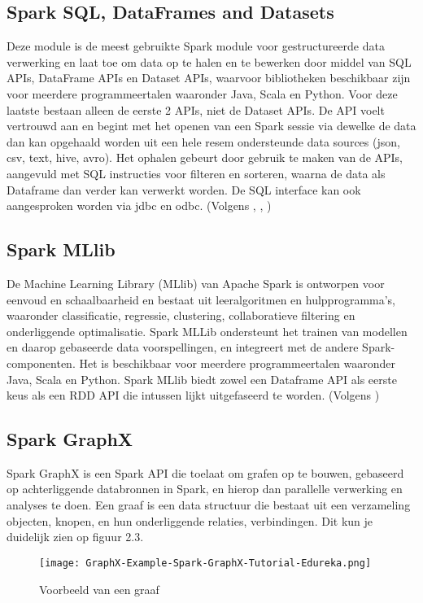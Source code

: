 \subsection{Spark SQL, DataFrames and Datasets}
Deze module is de meest gebruikte Spark module voor gestructureerde data verwerking en laat toe om data op te halen en te bewerken door middel van SQL APIs, DataFrame APIs en Dataset APIs, waarvoor bibliotheken beschikbaar zijn voor meerdere programmeertalen waaronder Java, Scala en Python. Voor deze laatste bestaan alleen de eerste 2 APIs, niet de Dataset APIs.
De API voelt vertrouwd aan en begint met het openen van een Spark sessie via dewelke de data dan kan opgehaald worden uit een hele resem ondersteunde data sources (json, csv, text, hive, avro). Het ophalen gebeurt door gebruik te maken van de APIs, aangevuld met SQL instructies voor filteren en sorteren, waarna de data als Dataframe dan verder kan verwerkt worden.
De SQL interface kan ook aangesproken worden via jdbc en odbc.
(Volgens \textcite{Spark2023}, \textcite{Naveen2023}, \textcite{Spark2023a})

\subsection{Spark MLlib}
De Machine Learning Library (MLlib) van Apache Spark is ontworpen voor eenvoud en schaalbaarheid  en bestaat uit leeralgoritmen en hulpprogramma's, waaronder classificatie, regressie, clustering, collaboratieve filtering en onderliggende optimalisatie. Spark MLLib ondersteunt het trainen van modellen en daarop gebaseerde data voorspellingen, en integreert met de andere Spark-componenten. Het is beschikbaar voor meerdere programmeertalen waaronder Java, Scala en Python.
Spark MLlib biedt zowel een Dataframe API als eerste keus als een RDD API die intussen lijkt uitgefaseerd te worden.
(Volgens \autocite{Spark2023b})

\subsection{Spark GraphX}
Spark GraphX is een Spark API die toelaat om grafen op te bouwen, gebaseerd op achterliggende databronnen in Spark, en hierop dan parallelle verwerking en analyses te doen. 
Een graaf is een data structuur die bestaat uit een verzameling objecten, knopen, en hun onderliggende relaties, verbindingen. Dit kun je duidelijk zien op figuur 2.3.
\newline
\newline
\begin{figure}[H]
    \texttt{[image: GraphX-Example-Spark-GraphX-Tutorial-Edureka.png]}
    \caption{Voorbeeld van een graaf\autocite{Dayananda2019}}
\end{figure}


